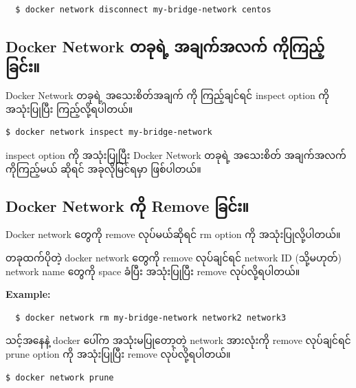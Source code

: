 \documentclass[]{article}
\begin{document}
\begin{verbatim}
  $ docker network disconnect my-bridge-network centos
\end{verbatim}

\hypertarget{docker-network-ux1010ux1001ux102fux101bux1032ux1037-ux1021ux1001ux103bux1000ux103aux1021ux101cux1000ux103a-ux1000ux102dux102fux1000ux103cux100aux1037ux103aux1001ux103cux1004ux103aux1038}{%
\subsection{Docker Network တခုရဲ့ အချက်အလက်
ကိုကြည့်ခြင်း။}\label{docker-network-ux1010ux1001ux102fux101bux1032ux1037-ux1021ux1001ux103bux1000ux103aux1021ux101cux1000ux103a-ux1000ux102dux102fux1000ux103cux100aux1037ux103aux1001ux103cux1004ux103aux1038}}

Docker Network တခုရဲ့ အသေးစိတ်အချက် ကို ကြည့်ချင်ရင် inspect option ကို
အသုံးပြုပြီး ကြည့်လို့ရပါတယ်။

\begin{verbatim}
$ docker network inspect my-bridge-network
\end{verbatim}

inspect option ကို အသုံးပြုပြီး Docker Network တခုရဲ့ အသေးစိတ်
အချက်အလက်ကိုကြည့်မယ် ဆိုရင် အခုလိုမြင်ရမှာ ဖြစ်ပါတယ်။

\hypertarget{docker-network-ux1000ux102dux102f-remove-ux1001ux103cux1004ux103aux1038}{%
\subsection{Docker Network ကို Remove
ခြင်း။}\label{docker-network-ux1000ux102dux102f-remove-ux1001ux103cux1004ux103aux1038}}

Docker network တွေကို remove လုပ်မယ်ဆိုရင် rm option ကို
အသုံးပြုလို့ပါတယ်။

တခုထက်ပိုတဲ့ docker network တွေကို remove လုပ်ချင်ရင် network ID
(သို့မဟုတ်) network name တွေကို space ခံပြီး အသုံးပြုပြီး remove
လုပ်လို့ရပါတယ်။

\textbf{Example:}

\begin{verbatim}
  $ docker network rm my-bridge-network network2 network3
\end{verbatim}

သင့်အနေနဲ့ docker ပေါ်က အသုံးမပြုတော့တဲ့ network အားလုံးကို remove
လုပ်ချင်ရင် prune option ကို အသုံးပြုပြီး remove လုပ်လို့ရပါတယ်။

\begin{verbatim}
$ docker network prune
\end{verbatim}
\end{document}
